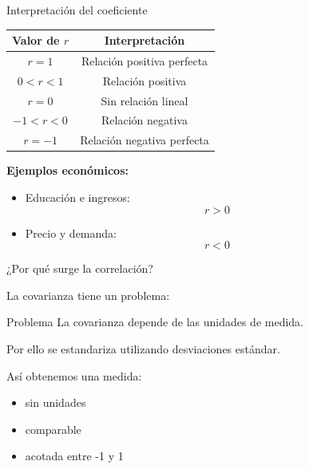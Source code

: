 \documentclass{beamer}
\begin{document}
\begin{frame}{Interpretación del coeficiente}

\begin{center}

\begin{tabular}{cc}
\toprule
Valor de \(r\) & Interpretación \\
\midrule
\(r=1\) & Relación positiva perfecta \\
\(0<r<1\) & Relación positiva \\
\(r=0\) & Sin relación lineal \\
\(-1<r<0\) & Relación negativa \\
\(r=-1\) & Relación negativa perfecta \\
\bottomrule
\end{tabular}

\end{center}

\vspace{0.4cm}

\textbf{Ejemplos económicos:}

\begin{itemize}
\item Educación e ingresos:
\[
r>0
\]

\item Precio y demanda:
\[
r<0
\]
\end{itemize}

\end{frame}

\begin{frame}{¿Por qué surge la correlación?}

La covarianza tiene un problema:

\vspace{0.3cm}

\begin{block}{Problema}
La covarianza depende de las unidades de medida.
\end{block}

\vspace{0.4cm}

Por ello se estandariza utilizando desviaciones estándar.

\vspace{0.4cm}

Así obtenemos una medida:

\begin{itemize}
\item sin unidades
\item comparable
\item acotada entre -1 y 1
\end{itemize}

\end{frame}
\end{document}
